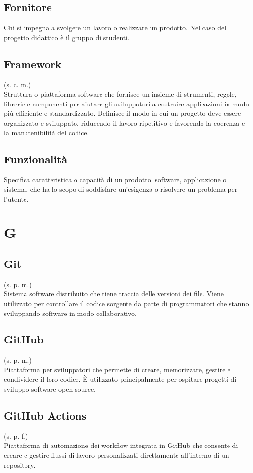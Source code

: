 \subsection{Fornitore}
Chi si impegna a svolgere un lavoro o realizzare un prodotto. Nel caso del
progetto didattico è il gruppo di studenti.
\subsection{Framework}
(s. c. m.)\\
Struttura o piattaforma software che fornisce un insieme di strumenti, regole,
librerie e componenti per aiutare gli sviluppatori a costruire applicazioni
in modo più efficiente e standardizzato. Definisce il modo in cui un progetto
deve essere organizzato e sviluppato, riducendo il lavoro ripetitivo e favorendo
la coerenza e la manutenibilità del codice.
\subsection{Funzionalità}
\label{Funzionalità}
Specifica caratteristica o capacità di un prodotto, software, applicazione o sistema,
che ha lo scopo di soddisfare un'esigenza o risolvere un problema per l'utente.
\pagebreak
\section{G}
\subsection{Git}
\label{Git}
(s. p. m.)\\
Sistema software distribuito che tiene traccia delle versioni dei file.
Viene utilizzato per controllare il codice sorgente da parte di programmatori
che stanno sviluppando software in modo collaborativo.
\subsection{GitHub}
\label{GitHub}
(s. p. m.)\\
Piattaforma per sviluppatori che permette di creare, memorizzare, gestire
e condividere il loro codice. È utilizzato principalmente per ospitare
progetti di sviluppo software open source.
\subsection{GitHub Actions}
\label{GitHub Actions}
(s. p. f.)\\
Piattaforma di automazione dei workflow integrata in GitHub che consente
di creare e gestire flussi di lavoro personalizzati direttamente all'interno
di un repository.
